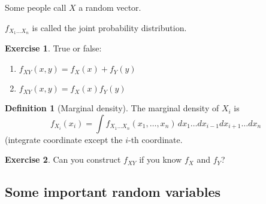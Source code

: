 \documentclass[
  openany]{book}
\theoremstyle{definition}
\newtheorem{definition}{Definition}[chapter]
\theoremstyle{definition}
\theoremstyle{definition}
\newtheorem{exercise}{Exercise}[chapter]
\theoremstyle{definition}
\theoremstyle{remark}
\begin{document}
Some people call \(X\) a random vector.

\(f_{X_1\dots X_n}\) is called the joint probability distribution.

\begin{exercise}

True or false:

\begin{enumerate}
\def\labelenumi{\arabic{enumi}.}
\item
  \(f_{XY}(x,y) = f_{X}(x) + f_{Y}(y)\)
\item
  \(f_{XY}(x,y) = f_{X}(x) f_{Y}(y)\)
\end{enumerate}

\end{exercise}

\begin{definition}[Marginal density]
The marginal density of \(X_i\) is
\[f_{X_i}(x_i) = \int f_{X_1\dots X_n}(x_1, \dots, x_n) \, dx_1\dots dx_{i-1} dx_{i+1} \dots dx_n\]
(integrate coordinate except the \(i\)-th coordinate.
\end{definition}

\begin{exercise}
Can you construct \(f_{XY}\) if you know \(f_X\) and \(f_Y\)?
\end{exercise}

\hypertarget{some-important-random-variables}{%
\subsection{Some important random variables}\label{some-important-random-variables}}
\end{document}

